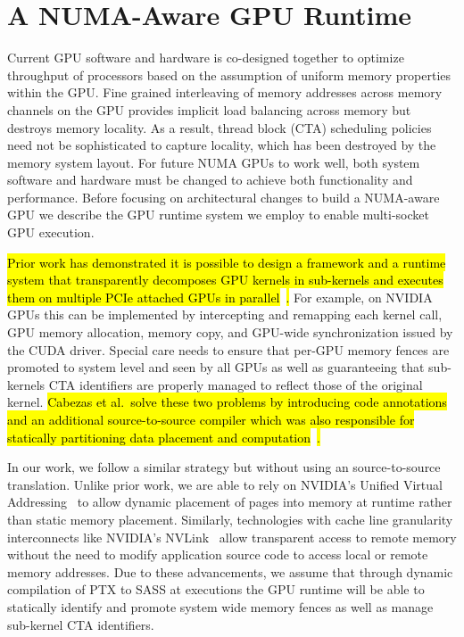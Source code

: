 \section{A NUMA-Aware GPU Runtime}

Current GPU software and hardware is co-designed together to optimize 
throughput of processors based on the assumption of uniform memory properties 
within the GPU. Fine grained interleaving of memory addresses across memory 
channels on the GPU provides implicit load balancing across memory but destroys 
memory locality.  As a result, thread block (CTA) scheduling policies need not 
be sophisticated to capture locality, which has been destroyed by the 
memory system layout.  For future NUMA GPUs to work well, both system software and 
hardware must be changed to achieve both functionality and performance.  Before 
focusing on architectural changes to build a NUMA-aware GPU we describe the GPU 
runtime system we employ to enable multi-socket GPU execution.

\hl{Prior work has demonstrated it is possible to design a framework and a runtime 
system that transparently decomposes GPU kernels in sub-kernels and executes 
them on multiple PCIe attached GPUs in parallel}~\cite{Cabezas2015, kim2011achieving, lee2013transparent}\hl{.} 
For example, on NVIDIA GPUs 
this can be implemented by intercepting and remapping each kernel call, GPU 
memory allocation, memory copy, and GPU-wide synchronization issued by the CUDA 
driver. Special care needs to ensure that per-GPU memory fences are promoted to 
system level and seen by all GPUs as well as guaranteeing that sub-kernels CTA 
identifiers are properly managed to reflect those of the original kernel. \hl{Cabezas et al.~solve 
these two problems by introducing  code 
annotations and an additional source-to-source compiler which was also 
responsible for statically partitioning data placement and computation}~\cite{Cabezas2015}\hl{.}

In our work, we follow a similar strategy but without using an source-to-source
translation. Unlike prior work, we are able to rely on NVIDIA's Unified Virtual 
Addressing~\cite{UVM} to allow dynamic placement of pages into memory at
runtime rather than static memory placement.  Similarly, technologies with
cache line granularity interconnects like NVIDIA's NVLink~\cite{NVLINK} allow
transparent access to remote memory without the need to modify application
source code to access local or remote memory addresses.  Due to these
advancements, we assume that through dynamic compilation of PTX to SASS at
executions the GPU runtime will be able to statically identify and promote 
system wide memory fences as well as manage sub-kernel CTA identifiers.

